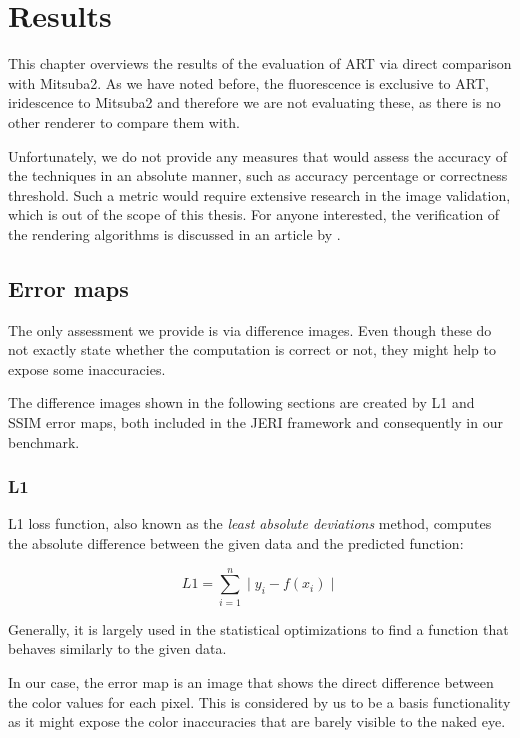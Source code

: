 \chapter{Results}
\label{chap:results}

This chapter overviews the results of the evaluation of ART via direct comparison with Mitsuba2. As we have noted before, the fluorescence is exclusive to ART, iridescence to Mitsuba2 and therefore we are not evaluating these, as there is no other renderer to compare them with.

Unfortunately, we do not provide any measures that would assess the accuracy of the techniques in an absolute manner, such as accuracy percentage or correctness threshold. Such a metric would require extensive research in the image validation, which is out of the scope of this thesis. For anyone interested, the verification of the rendering algorithms is discussed in an article by \citet{ulbricht2006verification}.

\section{Error maps}

The only assessment we provide is via difference images. Even though these do not exactly state whether the computation is correct or not, they might help to expose some inaccuracies.

The difference images shown in the following sections are created by L1 and SSIM error maps, both included in the JERI framework and consequently in our benchmark. 

\subsection{L1}

L1 loss function, also known as the \emph{least absolute deviations} method, computes the absolute difference between the given data and the predicted function:

\begin{equation}
L1=\sum_{i=1}^{n}\mid y_i - f(x_i) \mid
\end{equation}

Generally, it is largely used in the statistical optimizations to find a function that behaves similarly to the given data.

In our case, the error map is an image that shows the direct difference between the color values for each pixel. This is considered by us to be a basis functionality as it might expose the color inaccuracies that are barely visible to the naked eye.

